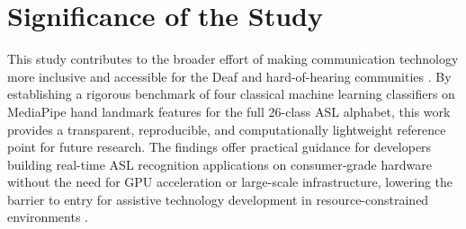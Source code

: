 \documentclass[12pt,runningheads]{llncs}
\begin{document}
\section{Significance of the Study}

This study contributes to the broader effort of making communication technology more inclusive and accessible for the Deaf and hard-of-hearing communities \cite{who2021,bakershenk1980}. By establishing a rigorous benchmark of four classical machine learning classifiers on MediaPipe hand landmark features \cite{zhang2020} for the full 26-class ASL alphabet, this work provides a transparent, reproducible, and computationally lightweight reference point for future research. The findings offer practical guidance for developers building real-time ASL recognition applications on consumer-grade hardware without the need for GPU acceleration or large-scale infrastructure, lowering the barrier to entry for assistive technology development in resource-constrained environments \cite{adeyanju2021,bantupalli2018}.







\end{document}
